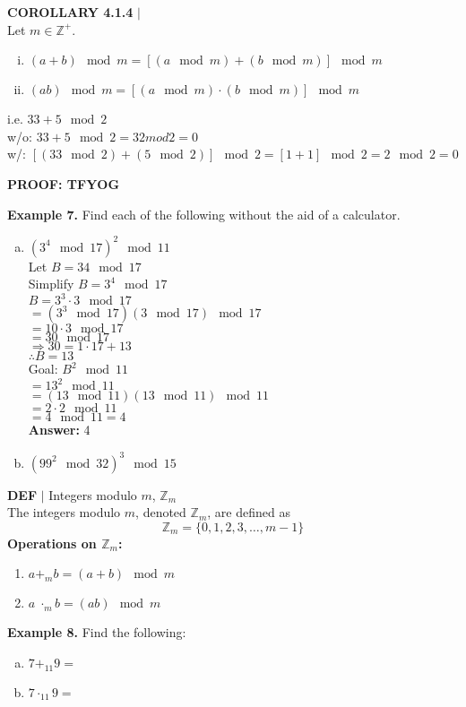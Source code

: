 \documentclass [12pt]{article}
\begin{document}
\begin{framed}
\textbf{COROLLARY 4.1.4} $|$ \\
\vspace{0.5cm}
Let $m \in \mathbb{Z}^{+}$. \\
\begin{enumerate}[(i)]
\item $(a+b)\mod m = [(a\mod m ) + (b\mod m)]\mod m$
\item $(ab)\mod m = [(a\mod m ) \cdot (b\mod m)]\mod m$
\end{enumerate}
i.e. $33 + 5 \mod 2$\\
w/o: $33 + 5 \mod 2 = 32 mod 2 = 0$\\
w/: $[(33 \mod 2)  + (5 \mod 2)]\mod 2 = [1 + 1] \mod 2 = 2 \mod 2 = 0$
\end{framed}
\vspace{0.5cm}
\textbf{PROOF: TFYOG}\\
\vspace{0.25in}
\raggedright
\textbf{Example 7.} Find each of the following without the aid of a calculator.
\begin{multicols}{2}
\begin{enumerate}[(a)]
\item $(3^4\mod 17)^{2}\mod 11$ \\
Let $B=34\mod 17$\\
Simplify $B = 3^4 \mod17$\\
\quad $B = 3^3 \cdot 3\mod 17$\\
\quad $= (3^3 \mod 17)(3\mod 17)\mod 17$\\
\quad $= 10\cdot 3 \mod 17$\\
\quad $= 30 \mod 17$\\
\quad\quad $\Rightarrow 30 = 1 \cdot 17 + 13$\\
$\therefore B = 13$\\
Goal: $B^2 \mod 11$\\
$= 13^2 \mod 11$\\
$= (13 \mod 11)(13 \mod 11)\mod 11$\\
$=2\cdot 2 \mod 11$\\
$=4 \mod 11 = 4$\\
\textbf{Answer: } 4

\columnbreak
\item $(99^2\mod 32)^3\mod 15$
\end{enumerate}
\end{multicols}
\vspace{5in}
\begin{framed}
\textbf{DEF} $|$ Integers modulo $m$, $\mathbb{Z}_m$\\
\vspace{0.5cm}
The integers modulo $m$, denoted $\mathbb{Z}_m$, are defined as
\[\mathbb{Z}_m = \{0,1, 2,3, \dots, m-1 \}\]
\textbf{Operations on $\mathbb{Z}_m$:}
\begin{enumerate}[]
\item $a +_{m} b = (a+b)\mod m$
\item $a \; \cdot_{m} b = (ab)\mod m$
\end{enumerate}
\end{framed}
\raggedright
\textbf{Example 8.} Find the following:
\begin{multicols}{2}
\begin{enumerate}[(a)]
\item $7 +_{11} 9 =$
\item $7 \cdot_{11} 9 =$
\end{enumerate}
\end{multicols}
\end{document}
